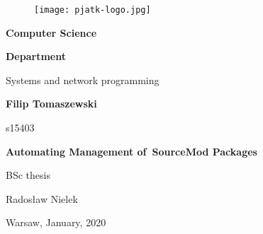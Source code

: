 \thispagestyle{empty}

\begin{figure}[H]
  \centering
  \texttt{[image: pjatk-logo.jpg]}
\end{figure}

\begin{center}

{\large \textbf{Computer Science}}

\vspace{1cm}

{\large \textbf{Department}}

\vspace{0.25cm}

Systems and network programming

\vspace{2cm}

{\large \textbf{Filip Tomaszewski}}

s15403

\vspace{1.5cm}

{\LARGE \textbf{Automating Management of~SourceMod Packages}}

\vspace{2cm}

\begin{flushright}

BSc thesis

Radosław Nielek

\end{flushright}

\vspace{\fill}

Warsaw, January, 2020

\end{center}

\newpage
{}
\setcounter{page}{1}
